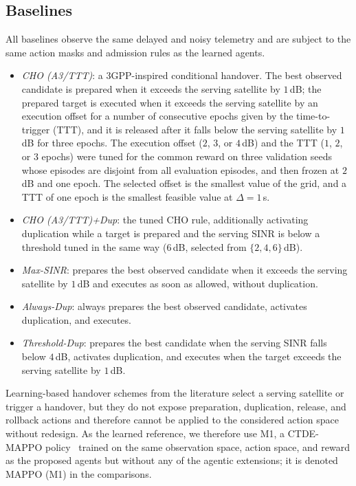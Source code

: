\documentclass[journal]{IEEEtran}
\begin{document}
\subsection{Baselines}
All baselines observe the same delayed and noisy telemetry and are subject
to the same action masks and admission rules as the learned agents.
\begin{itemize}
\item \emph{CHO (A3/TTT)}: a 3GPP-inspired conditional handover. The best
observed candidate is prepared when it exceeds the serving satellite by
$1$\,dB; the prepared target is executed when it exceeds the serving
satellite by an execution offset for a number of consecutive epochs given by
the time-to-trigger (TTT), and it is released after it falls below the
serving satellite by $1$\,dB for three epochs. The execution offset
($2$, $3$, or $4$\,dB) and the TTT ($1$, $2$, or $3$ epochs) were tuned for
the common reward on three validation seeds whose episodes are disjoint from
all evaluation episodes, and then frozen at $2$\,dB and one epoch. The
selected offset is the smallest value of the grid, and a TTT of one epoch is
the smallest feasible value at $\Delta=1$\,s.
\item \emph{CHO (A3/TTT)+Dup}: the tuned CHO rule, additionally activating
duplication while a target is prepared and the serving SINR is below a
threshold tuned in the same way ($6$\,dB, selected from $\{2,4,6\}$\,dB).
\item \emph{Max-SINR}: prepares the best observed candidate when it exceeds
the serving satellite by $1$\,dB and executes as soon as allowed, without
duplication.
\item \emph{Always-Dup}: always prepares the best observed candidate,
activates duplication, and executes.
\item \emph{Threshold-Dup}: prepares the best candidate when the serving SINR
falls below $4$\,dB, activates duplication, and executes when the target
exceeds the serving satellite by $1$\,dB.
\end{itemize}
Learning-based handover schemes from the literature
\cite{yang2023dqn,liu2024marlho,yang2024fingerprints,zhao2026hrl} select a
serving satellite or trigger a handover, but they do not expose preparation,
duplication, release, and rollback actions and therefore cannot be applied
to the considered action space without redesign. As the learned reference, we
therefore use M1, a CTDE-MAPPO policy~\cite{yu2022mappo} trained on the same
observation space, action space, and reward as the proposed agents but
without any of the agentic extensions; it is denoted MAPPO (M1) in the
comparisons.
\end{document}
